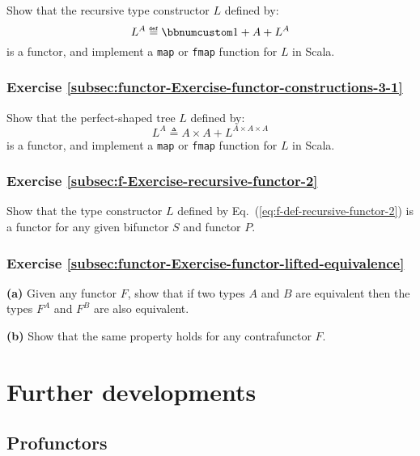 Show that the recursive type constructor $L$ defined by:
\[
L^{A}\triangleq\bbnum 1+A+L^{A}
\]
is a functor, and implement a \lstinline!map! or \lstinline!fmap!
function for $L$ in Scala.

\subsubsection{Exercise \label{subsec:functor-Exercise-functor-constructions-3-1}\ref{subsec:functor-Exercise-functor-constructions-3-1}}

Show that the perfect-shaped tree $L$ defined by:
\[
L^{A}\triangleq A\times A+L^{A\times A\times A}
\]
is a functor, and implement a \lstinline!map! or \lstinline!fmap!
function for $L$ in Scala.

\subsubsection{Exercise \label{subsec:f-Exercise-recursive-functor-2}\ref{subsec:f-Exercise-recursive-functor-2}}

Show that the type constructor $L$ defined by Eq.~(\ref{eq:f-def-recursive-functor-2})
is a functor for any given bifunctor $S$ and functor $P$. 

\subsubsection{Exercise \label{subsec:functor-Exercise-functor-lifted-equivalence}\ref{subsec:functor-Exercise-functor-lifted-equivalence}}

\textbf{(a)} Given any functor $F$, show that if two types $A$ and
$B$ are equivalent then the types $F^{A}$ and $F^{B}$ are also
equivalent.

\textbf{(b)} Show that the same property holds for any contrafunctor
$F$.

\section{Further developments}

\subsection{Profunctors\label{subsec:f-Profunctors}}

